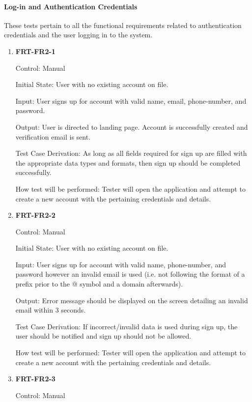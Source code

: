 \documentclass[12pt, titlepage]{article}
\begin{document}
\paragraph{Log-in and Authentication Credentials}

These tests pertain to all the functional requirements related to authentication credentials and the user logging in to the system.

\begin{enumerate}

\item{\textbf{FRT-FR2-1}}

Control: Manual
					
Initial State: User with no existing account on file.
					
Input: User signs up for account with valid name, email, phone-number, and password.
					
Output: User is directed to landing page. Account is successfully created and verification email is sent.

Test Case Derivation: As long as all fields required for sign up are filled with the appropriate data types and formats,
then sign up should be completed successfully.
					
How test will be performed: Tester will open the application and attempt to create a new account with the pertaining credentials and details. 
					
\item{\textbf{FRT-FR2-2}}

Control: Manual
					
Initial State: User with no existing account on file.
					
Input: User signs up for account with valid name, phone-number, and password however
an invalid email is used (i.e. not following the format of a prefix prior to the @ symbol and a domain afterwards).
					
Output: Error message should be displayed on the screen detailing an invalid email within 3 seconds.

Test Case Derivation: If incorrect/invalid data is used during sign up, the user should be notified and sign up should
not be allowed.

How test will be performed: Tester will open the application and attempt to create a new account with the pertaining credentials and details. 

\item{\textbf{FRT-FR2-3}}

Control: Manual
          

\end{enumerate}
\end{document}
